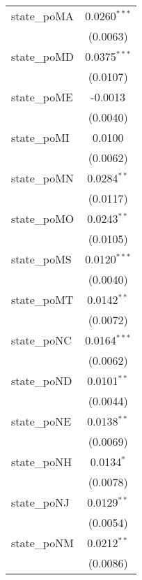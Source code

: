 \begin{tabular}{lc}
   state\_poMA                        & 0.0260$^{***}$\\   
                                      & (0.0063)\\   
   state\_poMD                        & 0.0375$^{***}$\\   
                                      & (0.0107)\\   
   state\_poME                        & -0.0013\\   
                                      & (0.0040)\\   
   state\_poMI                        & 0.0100\\   
                                      & (0.0062)\\   
   state\_poMN                        & 0.0284$^{**}$\\   
                                      & (0.0117)\\   
   state\_poMO                        & 0.0243$^{**}$\\   
                                      & (0.0105)\\   
   state\_poMS                        & 0.0120$^{***}$\\   
                                      & (0.0040)\\   
   state\_poMT                        & 0.0142$^{**}$\\   
                                      & (0.0072)\\   
   state\_poNC                        & 0.0164$^{***}$\\   
                                      & (0.0062)\\   
   state\_poND                        & 0.0101$^{**}$\\   
                                      & (0.0044)\\   
   state\_poNE                        & 0.0138$^{**}$\\   
                                      & (0.0069)\\   
   state\_poNH                        & 0.0134$^{*}$\\   
                                      & (0.0078)\\   
   state\_poNJ                        & 0.0129$^{**}$\\   
                                      & (0.0054)\\   
   state\_poNM                        & 0.0212$^{**}$\\   
                                      & (0.0086)\\   

\end{tabular}
